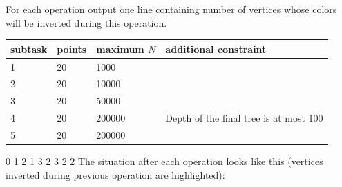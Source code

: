 
For each operation output one line containing number of vertices whose colors will be inverted
during this operation.


\centering
\begin{tabular}{|l|l|l|l|}
\hline
subtask & points & maximum $N$ & additional constraint                  \\ \hline
1       & 20     & 1000      &                                        \\ \hline
2       & 20     & 10000     &                                        \\ \hline
3       & 20     & 50000     &                                        \\ \hline
4       & 20     & 200000    & Depth of the final tree is at most 100 \\ \hline
5       & 20     & 200000    &                                        \\ \hline
\end{tabular}



0
1
2
1
3
2
3
2
2
\sampleCOMMENT
The situation after each operation looks like this (vertices inverted during previous operation are highlighted):
\sampleEND
{}

